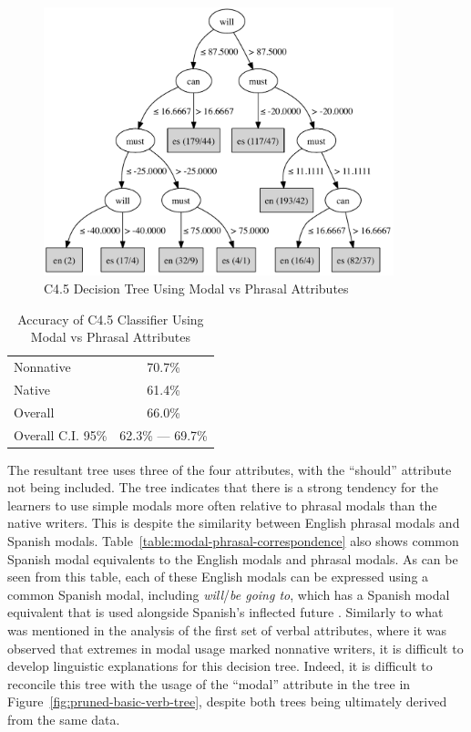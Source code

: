 \documentclass[main.tex]{subfiles}
\begin{document}
\begin{figure}[htbp]
\centering
\includegraphics[width=4in]{modal-phrasal-tree.pdf}
\caption{C4.5 Decision Tree Using Modal vs Phrasal Attributes}
\label{fig:modal-phrasal-tree}
\end{figure}
\begin{table}[htbp]
\centering
\caption{Accuracy of C4.5 Classifier Using Modal vs Phrasal Attributes}
\begin{tabular}{l c}
\toprule
Nonnative & 70.7\% \\
Native & 61.4\% \\
Overall & 66.0\% \\
Overall C.I. 95\% & 62.3\% --- 69.7\%\\
\bottomrule
\end{tabular}
\label{table:modal-phrasal-results}
\end{table}

The resultant tree uses three of the four attributes, with the ``should'' attribute not being included. The tree indicates that there is a strong tendency for the learners to use simple modals more often relative to phrasal modals than the native writers. This is despite the similarity between English phrasal modals and Spanish modals. Table~\ref{table:modal-phrasal-correspondence} also shows common Spanish modal equivalents to the English modals and phrasal modals. As can be seen from this table, each of these English modals can be expressed using a common Spanish modal, including \textit{will}/\textit{be going to}, which has a Spanish modal equivalent that is used alongside Spanish's inflected future \citep[ch. 14.6.4]{butt}. Similarly to what was mentioned in the analysis of the first set of verbal attributes, where it was observed that extremes in modal usage marked nonnative writers, it is difficult to develop linguistic explanations for this decision tree. Indeed, it is difficult to reconcile this tree with the usage of the ``modal'' attribute in the tree in Figure~\ref{fig:pruned-basic-verb-tree}, despite both trees being ultimately derived from the same data.
\end{document}
